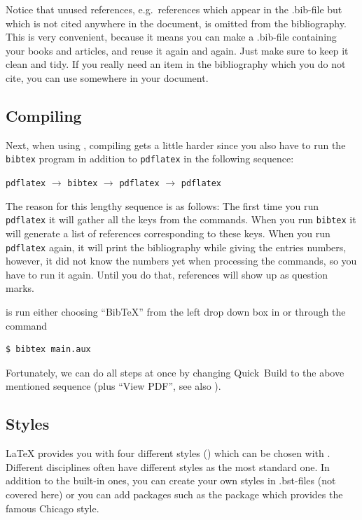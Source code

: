 {Notice that unused references, e.g.\ references which appear in the .bib-file but which is not cited anywhere in the document, is omitted from the bibliography. This is very convenient, because it means you can make a .bib-file containing your books and articles, and reuse it again and again. Just make sure to keep it clean and tidy. If you really need an item in the bibliography which you do not cite, you can use \latexin{\nocite} somewhere in your document.



\subsection{Compiling}
Next, when using \bibtex{}, compiling gets a little harder since you also have to run the \verb|bibtex| program in addition to \verb|pdflatex| in the following sequence:

\begin{center}
	\verb|pdflatex| $\rightarrow$ \verb|bibtex| $\rightarrow$ \verb|pdflatex| $\rightarrow$ \verb|pdflatex|
\end{center}

The reason for this lengthy sequence is as follows: The first time you run \verb|pdflatex| it will gather all the keys from the \latexin{\cite} commands. When you run \verb|bibtex| it will generate a list of references corresponding to these keys. When you run \verb|pdflatex| again, it will print the bibliography while giving the entries numbers, however, it did not know the numbers yet when processing the \latexin{\cite} commands, so you have to run it again. Until you do that, references will show up as question marks.

\bibtex{} is run either choosing ``BibTeX'' from the left drop down box in  or through the command

\begin{verbatim}
$ bibtex main.aux
\end{verbatim}
Fortunately, we can do all steps at once by changing Quick~Build to the above mentioned sequence (plus ``View PDF'', see also ).

\subsection{Styles}\label{sec:latex:bibstyle}
\LaTeX{} provides you with four different styles () which can be chosen with \latexin{}. Different disciplines often have different styles as the most standard one. In addition to the built-in ones, you can create your own styles in .bst-files (not covered here) or you can add packages such as the  package which provides the famous Chicago style.

}
